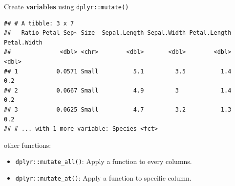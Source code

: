 \documentclass[14pt,ignorenonframetext,]{bredelebeamer}
\newenvironment{Shaded}{\begin{snugshade}}{\end{snugshade}}
\newcommand{\KeywordTok}[1]{\textcolor[rgb]{0.94,0.87,0.69}{#1}}
\newcommand{\DataTypeTok}[1]{\textcolor[rgb]{0.87,0.87,0.75}{#1}}
\newcommand{\DecValTok}[1]{\textcolor[rgb]{0.86,0.86,0.80}{#1}}
\newcommand{\FloatTok}[1]{\textcolor[rgb]{0.75,0.75,0.82}{#1}}
\newcommand{\StringTok}[1]{\textcolor[rgb]{0.80,0.58,0.58}{#1}}
\newcommand{\CommentTok}[1]{\textcolor[rgb]{0.50,0.62,0.50}{#1}}
\newcommand{\OperatorTok}[1]{\textcolor[rgb]{0.94,0.94,0.82}{#1}}
\newcommand{\NormalTok}[1]{\textcolor[rgb]{0.80,0.80,0.80}{#1}}
\providecommand{\tightlist}{%
  \setlength{\itemsep}{0pt}\setlength{\parskip}{0pt}}
\begin{document}
\begin{frame}[fragile]{Create \textbf{variables} using
\texttt{dplyr::mutate()}}

\begin{Shaded}
\end{Shaded}

\begin{verbatim}
## # A tibble: 3 x 7
##   Ratio_Petal_Sep~ Size  Sepal.Length Sepal.Width Petal.Length Petal.Width
##              <dbl> <chr>        <dbl>       <dbl>        <dbl>       <dbl>
## 1           0.0571 Small          5.1         3.5          1.4         0.2
## 2           0.0667 Small          4.9         3            1.4         0.2
## 3           0.0625 Small          4.7         3.2          1.3         0.2
## # ... with 1 more variable: Species <fct>
\end{verbatim}

other functions:

\begin{itemize}
\tightlist
\item
  \texttt{dplyr::mutate\_all()}: Apply a function to every columns.
\item
  \texttt{dplyr::mutate\_at()}: Apply a function to specific column.
\end{itemize}

\end{frame}
\end{document}
